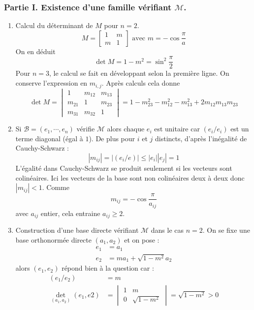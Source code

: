 \subsubsection*{Partie I. Existence d'une famille vérifiant $\mathcal M$.}
\begin{enumerate}
 \item Calcul du déterminant de $M$ pour $n=2$.
\begin{displaymath}
 M=
\begin{bmatrix}
 1 & m \\
 m & 1
\end{bmatrix}
\text{ avec }
m=-\cos \dfrac{\pi}{a}
\end{displaymath}
On en déduit
\begin{displaymath}
 \det M = 1 - m^2 = \sin^2 \dfrac{\pi}{2} 
\end{displaymath}
Pour $n=3$, le calcul se fait en développant selon la première ligne. On conserve l'expression en $m_{i,j}$. Après calculs cela donne
\begin{displaymath}
 \det M =
\begin{vmatrix}
 1 & m_{12} & m_{13} \\
m_{21} & 1 & m_{23}\\
m_{31} & m_{32} & 1
\end{vmatrix}
= 1 - m^2_{23}- m^2_{12}- m^2_{13}+2m_{12}m_{13}m_{23}
\end{displaymath}

\item Si $\mathcal B =(e_1,\cdots,e_n)$ vérifie $\mathcal M$ alors chaque $e_i$ est unitaire car $(e_i/e_i)$ est un terme diagonal (égal à $1$). De plus pour $i$ et $j$ distincts, d'après l'inégalité de Cauchy-Schwarz :
\begin{displaymath}
 |m_{ij}|=|(e_i/e)|\leq |e_i||e_j|=1
\end{displaymath}
L'égalité dans Cauchy-Schwarz se produit seulement si les vecteurs sont colinéaires. Ici les vecteurs de la base sont non colinéaires deux à deux donc $|m_{ij}|<1$. Comme 
\begin{displaymath}
 m_{ij}= - \cos \dfrac{\pi}{a_{ij}}
\end{displaymath}
avec $a_{ij}$ entier, cela entraine $a_{ij}\geq 2$.
\item Construction d'une base directe vérifiant $\mathcal M$ dans le cas $n=2$.\newline
On se fixe une base orthonormée directe $(a_1,a_2)$ et on pose :
\begin{align*}
 e_1 &= a_1 \\
 e_2 &= ma_1 + \sqrt{1-m^2}a_2
\end{align*}
alors $(e_1,e_2)$ répond bien à la question car :
\begin{align*}
 (e_1/e_2) &= m \\
 \det_{(a_1,a_2)}(e_1,e2) &=
\begin{vmatrix}
 1 & m \\
 0 & \sqrt{1-m^2}
\end{vmatrix}
=\sqrt{1-m^2}>0
\end{align*}


\end{enumerate}

